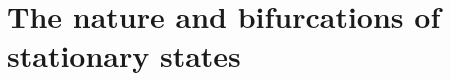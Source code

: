 \documentclass[10pt,aps,pre,preprint,superscriptaddress]{revtex4-1}
\newcommand{\debsankha}[1]{\textcolor{magenta}{#1}}
\begin{document}
%
%
%
%

\section{The nature and bifurcations of stationary states}
\label{sec:bifurcation}
\end{document}
